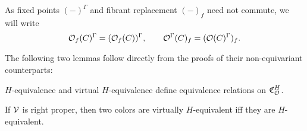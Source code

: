 \documentclass[a4paper,10pt
,draft
]{article}%
\newcommand{\I}{\mathbb I}
\newcommand{\J}{\mathbb J}
\renewcommand{\1}{\eta}%
\begin{document}
\begin{notation}
      As fixed points $(-)^\Gamma$ and fibrant replacement $(-)_f$ need not commute, we will write
      \begin{equation}
            \mathcal{O}_f(C)^\Gamma = (\mathcal{O}_f(C))^\Gamma,
            \qquad
            \mathcal{O}^\Gamma(C)_f = (\mathcal{O}(C)^{\Gamma})_f.
      \end{equation}
\end{notation}



The following two lemmas follow directly from the proofs of their non-equivariant counterparts:
\begin{lemma}
      \label{CAV_4.10_LEM}
      $H$-equivalence and virtual $H$-equivalence define equivalence relations on $\mathfrak C_{\mathcal{O}}^H$.
\end{lemma}

        
        
        


\begin{lemma}
      \label{RIGHTPROPER_LEM}
      If $\mathcal V$ is right proper, then two colors are virtually $H$-equivalent iff they are $H$-equivalent. 
\end{lemma}
\end{document}
